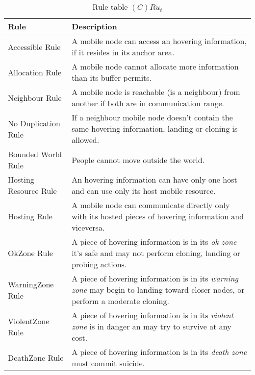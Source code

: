 \begin{table}[H]
	\centering
	\begin{tabular}{|p{4cm}|p{8cm}|}
			\hline
			\textbf{Rule} & \textbf{Description} \\
			\hline
			Accessible Rule & A mobile node can access an hovering information, if it
			resides in its anchor area. \\
			\hline
      Allocation Rule & A mobile node cannot allocate more information than its
      buffer permits. \\
			\hline
			Neighbour Rule & A mobile node is reachable (is a neighbour) from
			another if both are in communication range. \\
			\hline
			No Duplication Rule & If a neighbour mobile node doesn't contain the same
			hovering information, landing or cloning is allowed. \\
			\hline
			Bounded World Rule & People cannot move outside the world. \\
			\hline
      Hosting Resource Rule & An hovering information can have only one host and can use
      only its host mobile resource. \\
			\hline
      Hosting Rule & A mobile node can communicate directly only with its
      hosted pieces of hovering information and viceversa. \\
			\hline
      OkZone Rule & A piece of hovering information is in its \emph{ok zone}
      it's safe and may not perform cloning, landing or probing actions. \\
			\hline
      WarningZone Rule & A piece of hovering information is in its
      \emph{warning zone} may begin to landing toward closer nodes, or perform a moderate cloning. \\
			\hline
      ViolentZone Rule & A piece of hovering information is in its
      \emph{violent zone} is in danger an may try to survive at any cost. \\
			\hline
      DeathZone Rule & A piece of hovering information is in its \emph{death
      zone} must commit suicide. \\
			\hline
		\end{tabular}
	\caption{Rule table $(C)Ru_t$}
	\label{tab:crut}
\end{table}

